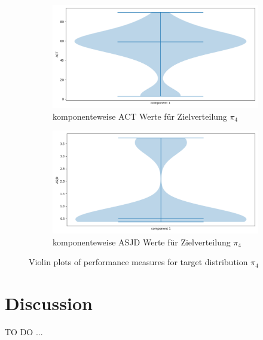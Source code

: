 \documentclass{scrartcl}
\begin{document}
    \begin{figure}
        \centering
        \begin{subfigure}{0.45\textheight}
              \centering
              \includegraphics[width=.8\linewidth]{../figs/ACT_pi_4.png}
              \caption{komponenteweise ACT Werte für Zielverteilung $\pi_4$}
              \label{violin_plots_pi_4_act}
        \end{subfigure}
        \begin{subfigure}{0.45\textheight}
              \centering
              \includegraphics[width=.8\linewidth]{../figs/ASJD_pi_4.png}
              \caption{komponenteweise ASJD Werte für Zielverteilung $\pi_4$}
              \label{violin_plots_pi_4_asjd}
        \end{subfigure}
        \caption{Violin plots of performance measures for target distribution $\pi_4$}
        \label{violin_plots_pi_4}
    \end{figure}

    \section{Discussion}
    TO DO ...

    
    
\end{document}
